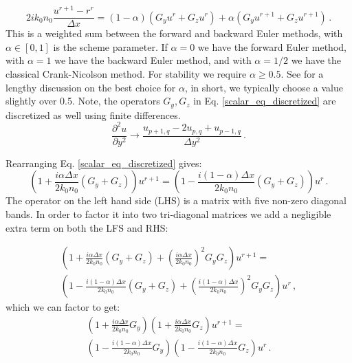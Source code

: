 \documentclass[]{article}
\begin{document}
	\begin{equation}
		2ik_0 n_0 \frac{u^{r+1}-r^r}{\Delta x} = (1-\alpha)\left( G_y u^r+G_z u^r\right) +\alpha\left( G_y u^{r+1}+G_z u^{r+1}\right)\, .
		\label{scalar_eq_discretized}
	\end{equation}
	This is a weighted sum between the forward and backward Euler methods, with $\alpha\in[0,1]$ is the scheme parameter. If $\alpha=0$ we have the forward Euler method, with $\alpha=1$ we have the backward Euler method, and with $\alpha=1/2$ we have the classical Crank-Nicolson method. For stability we require $\alpha \ge 0.5$. See \cite{Lifante_2015} for a lengthy discussion on the best choice for $\alpha$, in short, we typically choose a value slightly over 0.5. Note, the operators $G_y, G_z$ in Eq. \eqref{scalar_eq_discretized} are discretized as well using finite differences.
	\begin{equation}
		\frac{\partial^2 u}{\partial y^2} \to \frac{u_{p+1,q}-2u_{p,q}+u_{p-1,q}}{\Delta y^2}\, .
		\label{double_derivative}
	\end{equation}
	
	Rearranging Eq. \eqref{scalar_eq_discretized} gives:
	\begin{equation}
		\left(1+\frac{i\alpha \Delta x}{2k_0 n_0}(G_y+G_z) \right) u^{r+1} = \left(1-\frac{i(1-\alpha) \Delta x}{2k_0 n_0}(G_y+G_z) \right) u^r \, .
	\end{equation}
	The operator on the left hand side (LHS) is a matrix with five non-zero diagonal bands. In order to factor it into two tri-diagonal matrices we add a negligible extra term on both the LFS and RHS:
	
	\begin{multline*}
		\left(1+\frac{i\alpha \Delta x}{2k_0 n_0}(G_y+G_z) + \left(\frac{i\alpha \Delta x}{2k_0 n_0} \right) ^2 G_y G_z \right) u^{r+1} =\\
		 \left(1-\frac{i(1-\alpha) \Delta x}{2k_0 n_0}(G_y+G_z) +\left( \frac{i(1-\alpha) \Delta x}{2k_0 n_0}\right)^2 G_y G_z \right) u^r \, ,
	\end{multline*}
	which we can factor to get:
	\begin{multline}
		\left(1+\frac{i\alpha \Delta x}{2k_0 n_0}G_y \right)\left(1+\frac{i\alpha \Delta x}{2k_0 n_0}G_z \right) u^{r+1} = \\
		\left(1-\frac{i(1-\alpha) \Delta x}{2k_0 n_0}G_y \right)\left(1-\frac{i(1-\alpha) \Delta x}{2k_0 n_0}G_z \right) u^r \, .
		\label{ADI_setup}
	\end{multline}
	
\end{document}
